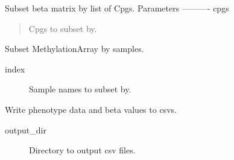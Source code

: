 \documentclass[letterpaper,10pt,english]{sphinxmanual}
\begin{document}
\begin{fulllineitems}
\begin{fulllineitems}
\label{\detokenize{index:pymethylprocess.MethylationDataTypes.MethylationArray.subset_cpgs}}
Subset beta matrix by list of Cpgs.
Parameters
———-
cpgs
\begin{quote}

Cpgs to subset by.
\end{quote}

\end{fulllineitems}


\begin{fulllineitems}
\label{\detokenize{index:pymethylprocess.MethylationDataTypes.MethylationArray.subset_index}}
Subset MethylationArray by samples.
\begin{description}
\item[{index}] \leavevmode
Sample names to subset by.

\end{description}

\end{fulllineitems}


\begin{fulllineitems}
\label{\detokenize{index:pymethylprocess.MethylationDataTypes.MethylationArray.write_csvs}}
Write phenotype data and beta values to csvs.
\begin{description}
\item[{output\_dir}] \leavevmode
Directory to output csv files.

\end{description}

\end{fulllineitems}



\end{fulllineitems}
\end{document}
